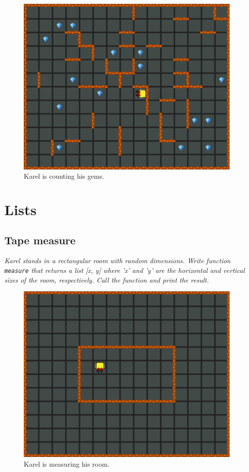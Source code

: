 {{\begin{figure}[!ht]
\begin{center}
\includegraphics[height=0.4\textwidth]{img/h01.png}
\end{center}
\vspace{-4mm}
\caption{Karel is counting his gems.}
\label{fig:h01}
\end{figure}


\section{Lists}


\subsection{Tape measure}

{\em Karel stands in a rectangular room with random dimensions. Write function {\tt measure}  
that returns a list [x, y] where 'x' and 'y' are the horizontal and vertical sizes of the room,
respectively. Call the function and print the result.}

\begin{figure}[!ht]
\begin{center}
\includegraphics[height=0.4\textwidth]{img/h02.png}
\end{center}
\vspace{-4mm}
\caption{Karel is measuring his room.}
\label{fig:h02}
\vspace{-1cm}
\end{figure}
\newpage


}}
